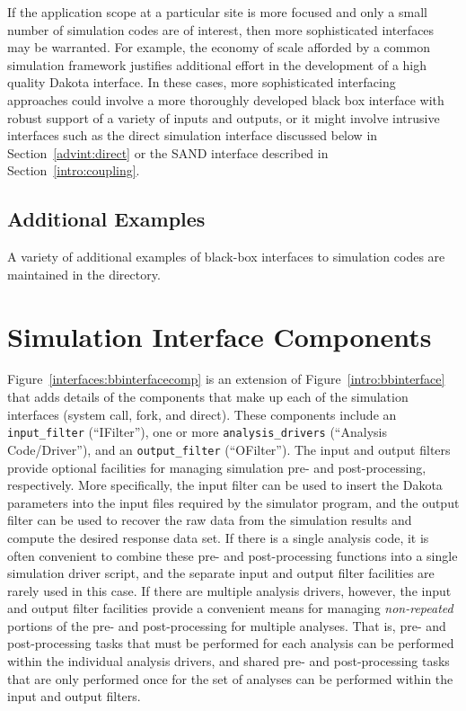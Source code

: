 If the application scope at a particular site is more focused and only
a small number of simulation codes are of interest, then more
sophisticated interfaces may be warranted. For example, the economy of
scale afforded by a common simulation framework justifies additional
effort in the development of a high quality Dakota interface. In these
cases, more sophisticated interfacing approaches could involve a more
thoroughly developed black box interface with robust support of a
variety of inputs and outputs, or it might involve intrusive
interfaces such as the direct simulation interface discussed below in
Section~\ref{advint:direct} or the SAND interface described in
Section~\ref{intro:coupling}.

\subsection{Additional Examples}

A variety of additional examples of black-box interfaces to simulation
codes are maintained in the
 directory.


\section{Simulation Interface Components}\label{interfaces:components}


Figure~\ref{interfaces:bbinterfacecomp} is an extension of
Figure~\ref{intro:bbinterface} that adds details of the
components that make up each of the simulation interfaces (system
call, fork, and direct).  These components include an
\texttt{input\_filter} (``IFilter''), one or more
\texttt{analysis\_drivers} (``Analysis Code/Driver''), and an
\texttt{output\_filter} (``OFilter''). The input and output filters
provide optional facilities for managing simulation pre- and
post-processing, respectively. More specifically, the input filter can
be used to insert the Dakota parameters into the input files required
by the simulator program, and the output filter can be used to recover
the raw data from the simulation results and compute the desired
response data set. If there is a single analysis code, it is often
convenient to combine these pre- and post-processing functions into a
single simulation driver script, and the separate input and output
filter facilities are rarely used in this case. If there are multiple
analysis drivers, however, the input and output filter facilities
provide a convenient means for managing \emph{non-repeated} portions of
the pre- and post-processing for multiple analyses. That is, pre- and
post-processing tasks that must be performed for each analysis can be
performed within the individual analysis drivers, and shared pre- and
post-processing tasks that are only performed once for the set of
analyses can be performed within the input and output filters.


